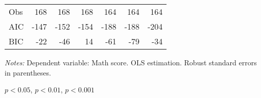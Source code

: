 \begin{table}[!h]
\begin{adjustbox}{width=1\textwidth}
\begin{threeparttable}
\begin{tabular}{l*{6}{D{.}{.}{-1}}}
Obs                 &                 168   &                 168   &                 168   &                 164   &                 164   &                 164   \\
AIC                 &                -147   &                -152   &                -154   &                -188   &                -188   &                -204   \\
BIC                 &                 -22   &                 -46   &                  14   &                 -61   &                 -79   &                 -34   \\
\bottomrule
\end{tabular}
\begin{tablenotes}
\footnotesize
\item \textit{Notes:} Dependent variable: Math score. OLS estimation. Robust standard errors in parentheses. \\
\item \sym{*} \(p<0.05\), \sym{**} \(p<0.01\), \sym{***} \(p<0.001\)
\end{tablenotes}
\end{threeparttable}
\end{adjustbox}
\label{tab:rev_cause}
\end{table}